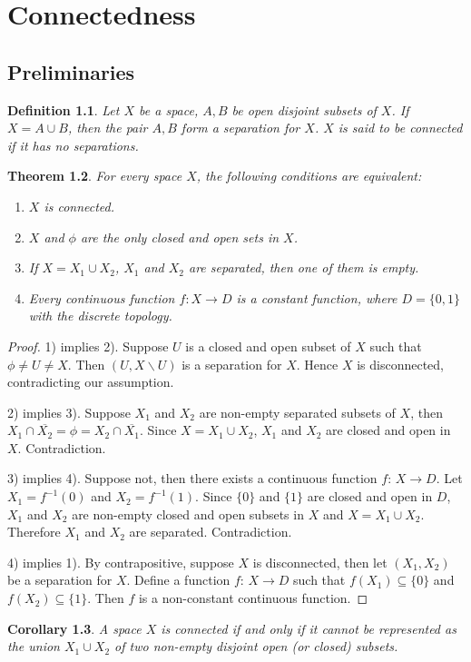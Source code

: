\documentclass[12pt,oneside,english]{amsbook}
\numberwithin{equation}{section} %
\numberwithin{figure}{section} %
\theoremstyle{plain}
\numberwithin{section}{chapter}
\newtheorem{thm}{Theorem}[section]
\theoremstyle{plain}
\newtheorem{corollary}[thm]{Corollary}
\newtheorem{defn}[thm]{Definition}
\begin{document}
\chapter{Connectedness}
\section{Preliminaries}
\begin{defn}\label{connectedness:1}
  Let $X$ be a space, $A, B$ be open disjoint subsets of $X$. If $X = A \cup B$, then the pair $A,B$ form a separation for $X$. $X$ is said to be connected if it has no separations.
\end{defn}
\begin{thm}\label{connectedness:2}
  For every space $X$, the following conditions are equivalent:
  \begin{enumerate}
  \item $X$ is connected.
  \item $X$ and $\phi$ are the only closed and open sets in $X$.
  \item If $X = X_1 \cup X_2$, $X_1$ and $X_2$ are separated, then one of them is empty.
  \item Every continuous function $f: X \to D$ is a constant function, where $D = \{0,1\}$ with the discrete topology.
  \end{enumerate}
\end{thm}
\begin{proof}
  1) implies 2). Suppose $U$ is a closed and open subset of $X$ such that $\phi \neq U \neq X$. Then $(U,X \backslash U)$ is a separation for $X$. Hence $X$ is disconnected, contradicting our assumption.

  2) implies 3). Suppose $X_1$ and $X_2$ are non-empty separated subsets of $X$, then $X_1 \cap \overline{X_2} = \phi = X_2 \cap \overline{X_1}$. Since $X = X_1 \cup X_2$, $X_1$ and $X_2$ are closed and open in $X$. Contradiction.

  3) implies 4). Suppose not, then there exists a continuous function $f: \, X \to D$. Let $X_1 = f^{-1}(0)$ and $X_2 = f^{-1}(1)$. Since $\{0\}$ and $\{1\}$ are closed and open in $D$, $X_1$ and $X_2$ are non-empty closed and open subsets in $X$ and $X = X_1 \cup X_2$. Therefore $X_1$ and $X_2$ are separated. Contradiction.

  4) implies 1). By contrapositive, suppose $X$ is disconnected, then let $(X_1,X_2)$ be a separation for $X$. Define a function $f: \, X \to D$ such that $f(X_1) \subseteq \{0\}$ and $f(X_2) \subseteq \{1\}$. Then $f$ is a non-constant continuous function.
\end{proof}
\begin{corollary}\label{connectedness:3}
  A space $X$ is connected if and only if it cannot be represented as the union $X_1 \cup X_2$ of two non-empty disjoint open (or closed) subsets.
\end{corollary}
\end{document}

